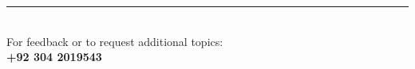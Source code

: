 \documentclass[12pt]{article}
\begin{document}
\vspace{20pt}
\begin{center}
  \color{grayclr}\rule{0.6\linewidth}{0.4pt}\\[8pt]
  {\small\color{darktext} For feedback or to request additional topics:}\\[4pt]
  {\normalsize\bfseries\color{primary} +92 304 2019543}
\end{center}
\end{document}
